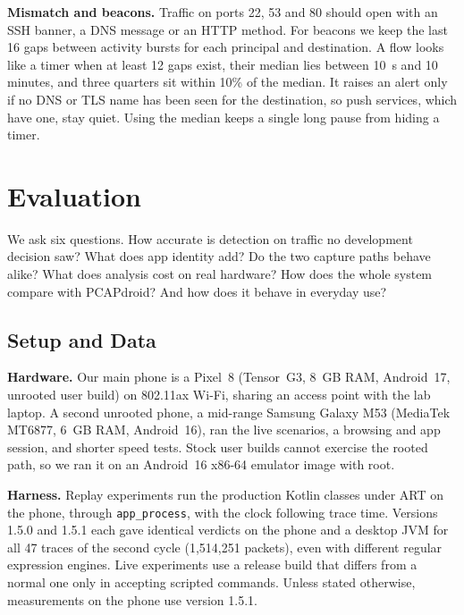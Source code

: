 \documentclass[runningheads]{llncs}
\begin{document}
\textbf{Mismatch and beacons.} Traffic on ports 22, 53 and 80 should open with an SSH banner, a DNS message or an HTTP method. For beacons we keep the last 16 gaps between activity bursts for each principal and destination. A flow looks like a timer when at least 12 gaps exist, their median lies between 10~s and 10 minutes, and three quarters sit within 10\% of the median. It raises an alert only if no DNS or TLS name has been seen for the destination, so push services, which have one, stay quiet. Using the median keeps a single long pause from hiding a timer.

\section{Evaluation}\label{sec:evaluation}

We ask six questions. How accurate is detection on traffic no development decision saw? What does app identity add? Do the two capture paths behave alike? What does analysis cost on real hardware? How does the whole system compare with PCAPdroid? And how does it behave in everyday use?

\subsection{Setup and Data}\label{sec:setup}

\textbf{Hardware.} Our main phone is a Pixel~8 (Tensor~G3, 8~GB RAM, Android~17, unrooted user build) on 802.11ax Wi-Fi, sharing an access point with the lab laptop. A second unrooted phone, a mid-range Samsung Galaxy M53 (MediaTek MT6877, 6~GB RAM, Android~16), ran the live scenarios, a browsing and app session, and shorter speed tests. Stock user builds cannot exercise the rooted path, so we ran it on an Android~16 x86-64 emulator image with root.

\textbf{Harness.} Replay experiments run the production Kotlin classes under ART on the phone, through \texttt{app\_process}, with the clock following trace time. Versions 1.5.0 and 1.5.1 each gave identical verdicts on the phone and a desktop JVM for all 47 traces of the second cycle (1{,}514{,}251 packets), even with different regular expression engines. Live experiments use a release build that differs from a normal one only in accepting scripted commands. Unless stated otherwise, measurements on the phone use version 1.5.1.
\end{document}
